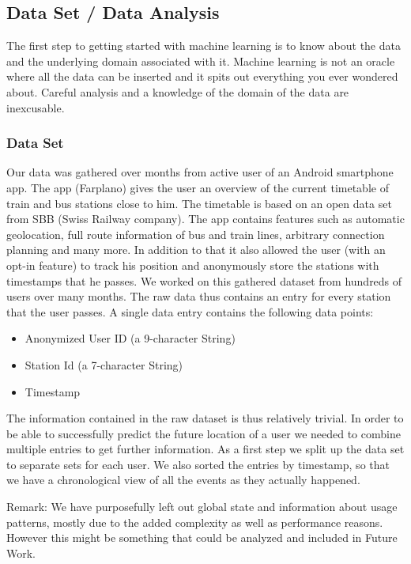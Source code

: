 \subsection{Data Set / Data Analysis}
\label{subsec:data_set}
The first step to getting started with machine learning is to know about the data and the underlying domain associated with it. Machine learning is not an oracle where all the data can be inserted and it spits out everything you ever wondered about. Careful analysis and a knowledge of the domain of the data are inexcusable. 

\subsubsection{Data Set}
Our data was gathered over months from active user of an Android smartphone app. The app (Farplano) gives the user an overview of the current timetable of train and bus stations close to him. The timetable is based on an open data set from SBB (Swiss Railway company). The app contains features such as automatic geolocation, full route information of bus and train lines, arbitrary connection planning and many more. In addition to that it also allowed the user (with an opt-in feature) to track his position and anonymously store the stations with timestamps that he passes. We worked on this gathered dataset from hundreds of users over many months. The raw data thus contains an entry for every station that the user passes. A single data entry contains the following data points:
\begin{itemize}
	\item Anonymized User ID (a 9-character String)
	\item Station Id (a 7-character String)
	\item Timestamp
\end{itemize}
The information contained in the raw dataset is thus relatively trivial. In order to be able to successfully predict the future location of a user we needed to combine multiple entries to get further information. As a first step we split up the data set to separate sets for each user. We also sorted the entries by timestamp, so that we have a chronological view of all the events as they actually happened.

Remark: We have purposefully left out global state and information about usage patterns, mostly due to the added complexity as well as performance reasons. However this might be something that could be analyzed and included in Future Work. 


